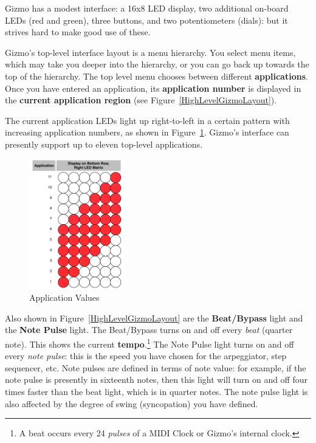 \documentclass{article}
\begin{document}
Gizmo has a modest interface: a 16x8 LED display, two additional on-board LEDs (red and green), three buttons, and two potentiometers (dials): but it strives hard to make good use of these.  

Gizmo's top-level interface layout is a menu hierarchy.  You select menu items, which may take you deeper into the hierarchy, or you can go back up towards the top of the hierarchy.  The top level menu chooses between different {\bf applications}.  Once you have entered an application, its {\bf application number} is displayed in the {\bf current application region} (see Figure~\ref{HighLevelGizmoLayout}).

The current application LEDs light up right-to-left in a certain pattern with increasing application numbers, as shown in Figure~\ref{applicationvalues}.  Gizmo's interface can presently support up to eleven top-level applications.  

\begin{figure}
\vspace{-3em}\includegraphics[width=1.6in]{Application.pdf}
\vspace{-2em}\caption{\small Application Values}
\vspace{-1em}
\label{applicationvalues}
\end{figure}

Also shown in Figure~\ref{HighLevelGizmoLayout} are the {\bf Beat/Bypass} light and the {\bf Note Pulse} light.  The Beat/Bypass turns on and off every {\it beat} (quarter note).  This shows the current {\bf tempo}.\footnote{A beat occurs every 24 {\it pulses} of a MIDI Clock or Gizmo's internal clock.}  The Note Pulse light turns on and off every {\it note pulse}: this is the speed you have chosen for the arpeggiator, step sequencer, etc.  Note pulses are defined in terms of note value: for example, if the note pulse is presently in sixteenth notes, then this light will turn on and off four times faster than the beat light, which is in quarter notes. The note pulse light is also affected by the degree of swing (syncopation) you have defined.
\end{document}
